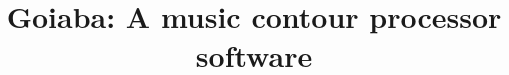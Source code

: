 \documentclass{article}
\title{Goiaba: A music contour processor software}
\begin{document}
\maketitle

\begin{abstract}
  
\end{abstract}





\end{document}
